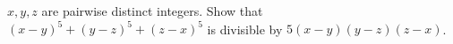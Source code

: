 $x, y, z$ are pairwise distinct integers. Show that $(x - y)^5 + (y - z)^5 + (z - x)^5$ is divisible by $5(x - y)(y - z)(z - x)$.
